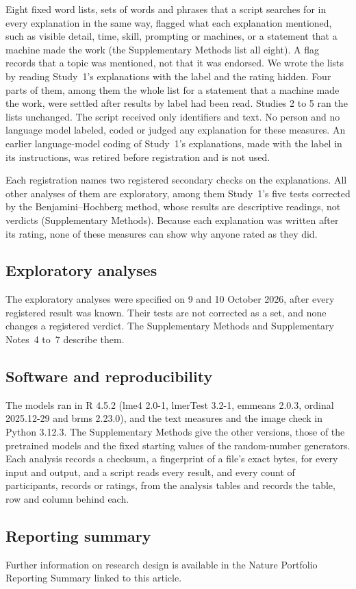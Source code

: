 Eight fixed word lists, sets of words and phrases that a script searches for in every explanation in the same way, flagged what each explanation mentioned, such as visible detail, time, skill, prompting or machines, or a statement that a machine made the work (the Supplementary Methods list all eight). A flag records that a topic was mentioned, not that it was endorsed. We wrote the lists by reading Study~1's explanations with the label and the rating hidden. Four parts of them, among them the whole list for a statement that a machine made the work, were settled after results by label had been read. Studies 2 to 5 ran the lists unchanged. The script received only identifiers and text. No person and no language model labeled, coded or judged any explanation for these measures. An earlier language-model coding of Study~1's explanations, made with the label in its instructions, was retired before registration and is not used.

Each registration names two registered secondary checks on the explanations. All other analyses of them are exploratory, among them Study~1's five tests corrected by the Benjamini--Hochberg method,\cite{benjamini1995controlling} whose results are descriptive readings, not verdicts (Supplementary Methods). Because each explanation was written after its rating, none of these measures can show why anyone rated as they did.

\subsection*{Exploratory analyses}

The exploratory analyses were specified on 9 and 10 October 2026, after every registered result was known. Their tests are not corrected as a set, and none changes a registered verdict. The Supplementary Methods and Supplementary Notes~4 to~7 describe them.

\subsection*{Software and reproducibility}

The models ran in R 4.5.2 (lme4 2.0-1, lmerTest 3.2-1, emmeans 2.0.3, ordinal 2025.12-29 and brms 2.23.0), and the text measures and the image check in Python 3.12.3. The Supplementary Methods give the other versions, those of the pretrained models and the fixed starting values of the random-number generators. Each analysis records a checksum, a fingerprint of a file's exact bytes, for every input and output, and a script reads every result, and every count of participants, records or ratings, from the analysis tables and records the table, row and column behind each.


\subsection*{Reporting summary}

Further information on research design is available in the Nature Portfolio Reporting Summary linked to this article.
